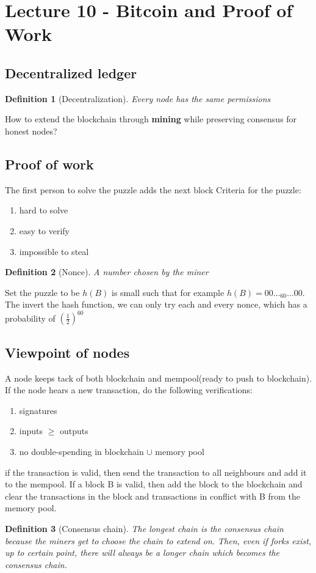 \documentclass[../main.tex]{subfile}
\begin{document}
\newtheorem{theorem}{Theorem}
\newtheorem{example}{Example}[theorem]
\newtheorem{task}{Task}
\newtheorem{definition}{Definition}
\section{Lecture 10 - Bitcoin and Proof of Work}
\subsection{Decentralized ledger}
\begin{definition}[Decentralization]
Every node has the same permissions	
\end{definition}
How to extend the blockchain through \textbf{mining} while preserving consensus for honest nodes?
\subsection{Proof of work}
The first person to solve the puzzle adds the next block
Criteria for the puzzle:
\begin{enumerate}
	\item hard to solve
	\item easy to verify
	\item impossible to steal
\end{enumerate}
\begin{definition}[Nonce]
	A number chosen by the miner
\end{definition}
Set the puzzle to be $h(B)$ is small such that for example $h(B) = 00\ldots_{60}\ldots00$.
The invert the hash function, we can only try each and every nonce, which has a probability of $(\frac{1}{2})^{60}$
\subsection{Viewpoint of nodes}
A node keeps tack of both blockchain and mempool(ready to push to blockchain). If the node hears a new transaction, do the following verifications:
\begin{enumerate}
	\item signatures
	\item inputs $\ge $ outputs
	\item no double-spending in blockchain $\cup$ memory pool 
\end{enumerate}
if the transaction is valid, then send the transaction to all neighbours and add it to the mempool.
If a block B is valid, then add the block to the blockchain and clear the transactions in the block and transactions in conflict with B from the memory pool.
\begin{definition}[Consensus chain]
The longest chain is the consensus chain because the miners get to choose the chain to extend on. Then, even if forks exist, up to certain point, there will always be a longer chain which becomes the consensus chain.	
\end{definition}
\end{document}
